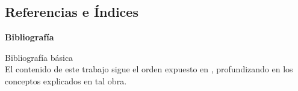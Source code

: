 \documentclass{scrbook}
\theoremstyle{definition}
\theoremstyle{remark}
\begin{document}
% 

\cleardoublepage
{}

\backmatter %
\cleardoublepage
{}




% 
\begin{small} %

\cleardoublepage
{}
\part*{Referencias e Índices}

\vspace*{1.5cm}
{\sffamily \LARGE \textbf{Bibliografía}}\\[8pt]
\thispagestyle{plain}

{\sffamily \Large {Bibliografía básica}}\\

{\normalsize El contenido de este trabajo sigue el orden expuesto en \cite{MacCormick2018}, profundizando en los conceptos explicados en tal obra.}\\


\printbibliography[heading=subbibliography,keyword={basica},heading=none]
\vspace{18pt}
\printbibliography[heading=subbibliography,notkeyword={basica},heading=none]

\end{small}
\end{document}
